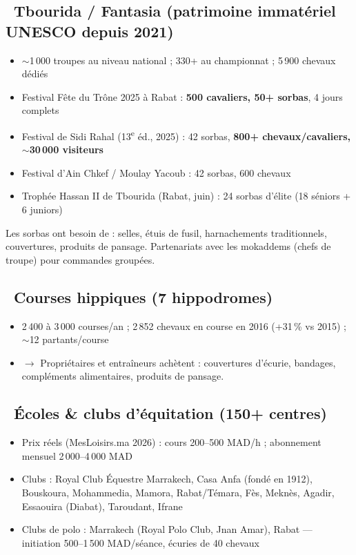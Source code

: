 \documentclass[11pt,a4paper]{article}
\begin{document}
\subsection{\faUsers\ Tbourida / Fantasia (patrimoine immatériel UNESCO depuis 2021)}
\begin{itemize}
  \item $\sim$1\,000 troupes au niveau national ; 330+ au championnat ; 5\,900 chevaux dédiés
  \item Festival Fête du Trône 2025 à Rabat : \textbf{500 cavaliers, 50+ sorbas}, 4 jours complets
  \item Festival de Sidi Rahal (13\textsuperscript{e} éd., 2025) : 42 sorbas, \textbf{800+ chevaux/cavaliers, $\sim$30\,000 visiteurs}
  \item Festival d'Ain Chkef / Moulay Yacoub : 42 sorbas, 600 chevaux
  \item Trophée Hassan II de Tbourida (Rabat, juin) : 24 sorbas d'élite (18 séniors + 6 juniors)
\end{itemize}

\begin{actionbox}
Les sorbas ont besoin de : selles, étuis de fusil, harnachements traditionnels, couvertures, produits de pansage. Partenariats avec les mokaddems (chefs de troupe) pour commandes groupées.
\end{actionbox}

\subsection{\faTrophy\ Courses hippiques (7 hippodromes)}
\begin{itemize}
  \item 2\,400 à 3\,000 courses/an ; 2\,852 chevaux en course en 2016 (+31\,\% vs 2015) ; $\sim$12 partants/course
  \item $\rightarrow$ Propriétaires et entraîneurs achètent : couvertures d'écurie, bandages, compléments alimentaires, produits de pansage.
\end{itemize}

\subsection{\faGraduationCap\ Écoles \& clubs d'équitation (150+ centres)}
\begin{itemize}
  \item Prix réels (MesLoisirs.ma 2026) : cours 200--500 MAD/h ; abonnement mensuel 2\,000--4\,000 MAD
  \item Clubs : Royal Club Équestre Marrakech, Casa Anfa (fondé en 1912), Bouskoura, Mohammedia, Mamora, Rabat/Témara, Fès, Meknès, Agadir, Essaouira (Diabat), Taroudant, Ifrane
  \item Clubs de polo : Marrakech (Royal Polo Club, Jnan Amar), Rabat --- initiation 500--1\,500 MAD/séance, écuries de 40 chevaux
\end{itemize}
\end{document}
